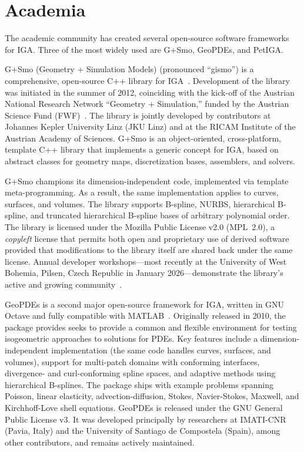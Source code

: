 \documentclass[12pt,report,justified]{SANDreport}
\begin{document}
\section{Academia}

The academic community has created several open-source software frameworks for IGA.  Three of the most widely used are G+Smo, GeoPDEs, and PetIGA.

G+Smo (Geometry + Simulation Models) (pronounced ``gismo'') is a comprehensive, open-source C++ library for IGA~\cite{Juttler2014GSmo}.  Development of the library was initiated in the summer of 2012, coinciding with the kick-off of the Austrian National Research Network ``Geometry + Simulation,'' funded by the Austrian Science Fund (FWF)~\cite{GSmoWiki2024}.  The library is jointly developed by contributors at Johannes Kepler University Linz (JKU Linz) and at the RICAM Institute of the Austrian Academy of Sciences.  G+Smo is an object-oriented, cross-platform, template C++ library that implements a generic concept for IGA, based on abstract classes for geometry maps, discretization bases, assemblers, and solvers.  

G+Smo champions its dimension-independent code, implemented via template meta-programming.  As a result, the same implementation applies to curves, surfaces, and volumes.  The library supports B-spline, NURBS, hierarchical B-spline, and truncated hierarchical B-spline bases of arbitrary polynomial order.  The library is licensed under the Mozilla Public License v2.0 (MPL~2.0), a \emph{copyleft} license that permits both open and proprietary use of derived software provided that modifications to the library itself are shared back under the same license.  Annual developer workshops---most recently at the University of West Bohemia, Pilsen, Czech Republic in January 2026---demonstrate the library's active and growing community~\cite{GSmoWiki2024}.

GeoPDEs is a second major open-source framework for IGA, written in GNU Octave and fully compatible with MATLAB~\cite{deFalco2011GeoPDEs,Vazquez2016GeoPDEs}.  Originally released in 2010, the package provides seeks to provide a common and flexible environment for testing isogeometric approaches to solutions for PDEs. Key features include a dimension-independent implementation (the same code handles curves, surfaces, and volumes), support for multi-patch domains with conforming interfaces, divergence- and curl-conforming spline spaces, and adaptive methods using hierarchical B-splines.  The package ships with example problems spanning Poisson, linear elasticity, advection-diffusion, Stokes, Navier-Stokes, Maxwell, and Kirchhoff-Love shell equations.  GeoPDEs is released under the GNU General Public License v3.  It was developed principally by researchers at IMATI-CNR (Pavia, Italy) and the University of Santiago de Compostela (Spain), among other contributors, and remains actively maintained.
\end{document}
